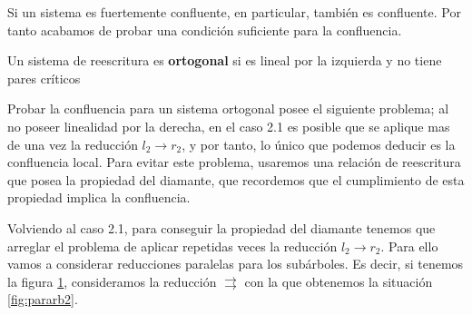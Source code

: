 Si un sistema es fuertemente confluente, en particular, también es
confluente. Por tanto acabamos de probar una condición suficiente para la
confluencia.


\begin{defi}
  Un sistema de reescritura es \textbf{ortogonal} si es lineal por la izquierda
  y no tiene pares críticos
\end{defi}

Probar la confluencia para un sistema ortogonal posee el siguiente
problema; al no poseer linealidad por la derecha, en el caso 2.1 es
posible que se aplique mas de una vez la reducción $l_2 \rightarrow r_2$,
y por tanto, lo único que podemos deducir es la confluencia
local. Para evitar este problema, usaremos una relación de reescritura
que posea la propiedad del diamante, que recordemos que el
cumplimiento de esta propiedad implica la confluencia.

Volviendo al caso 2.1, para conseguir la propiedad del diamante
tenemos que arreglar el problema de aplicar repetidas veces la
reducción $l_2 \rightarrow r_2$. Para ello vamos a considerar
reducciones paralelas para los subárboles. Es decir, si tenemos la
figura \ref{fig:pararb1}, consideramos la reducción
$\rightrightarrows$ con la que obtenemos la situación \ref{fig:pararb2}.

\begin{figure}
\centering
\usetikzlibrary{decorations.pathreplacing}
\caption{}
\label{fig:pararb1}
\end{figure}


